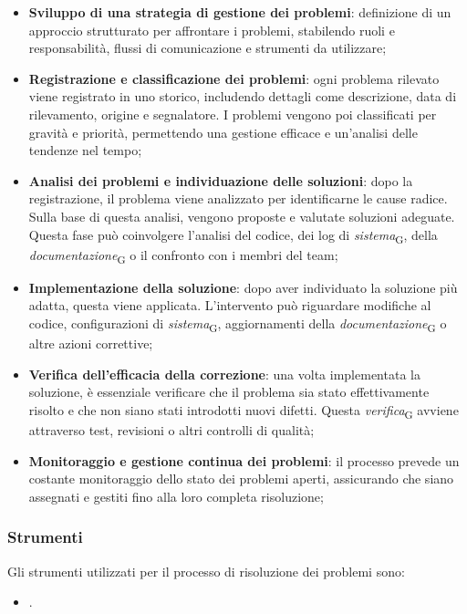 \begin{itemize}
    \item \textbf{Sviluppo di una strategia di gestione dei problemi}: definizione di un approccio strutturato per affrontare i problemi, stabilendo ruoli e responsabilità, flussi di comunicazione e strumenti da utilizzare;
    \item \textbf{Registrazione e classificazione dei problemi}: ogni problema rilevato viene registrato in uno storico, includendo dettagli come descrizione, data di rilevamento, origine e segnalatore. I problemi vengono poi classificati per gravità e priorità, permettendo una gestione efficace e un'analisi delle tendenze nel tempo;
    \item \textbf{Analisi dei problemi e individuazione delle soluzioni}: dopo la registrazione, il problema viene analizzato per identificarne le cause radice. Sulla base di questa analisi, vengono proposte e valutate soluzioni adeguate. Questa fase può coinvolgere l'analisi del codice, dei log di \textit{sistema}\textsubscript{G}, della \textit{documentazione}\textsubscript{G} o il confronto con i membri del team;
    \item \textbf{Implementazione della soluzione}: dopo aver individuato la soluzione più adatta, questa viene applicata. L’intervento può riguardare modifiche al codice, configurazioni di \textit{sistema}\textsubscript{G}, aggiornamenti della \textit{documentazione}\textsubscript{G} o altre azioni correttive;
    \item \textbf{Verifica dell’efficacia della correzione}: una volta implementata la soluzione, è essenziale verificare che il problema sia stato effettivamente risolto e che non siano stati introdotti nuovi difetti. Questa \textit{verifica}\textsubscript{G} avviene attraverso test, revisioni o altri controlli di qualità;
    \item \textbf{Monitoraggio e gestione continua dei problemi}: il processo prevede un costante monitoraggio dello stato dei problemi aperti, assicurando che siano assegnati e gestiti fino alla loro completa risoluzione;
\end{itemize}

\subsubsection{Strumenti}
Gli strumenti utilizzati per il processo di risoluzione dei problemi sono:
\begin{itemize}
    \item {}.
\end{itemize}